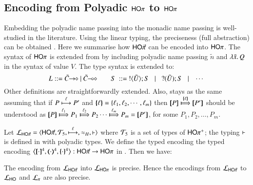 \subsection{Encoding from Polyadic $\mathsf{HO}\pi$ to $\mathsf{HO}\pi$}
\label{subsec:pho}
\noi Embedding the polyadic name passing 
into the monadic name passing is well-studied in the literature.    
Using the linear typing, 
the preciseness (full abstraction) can be obtained \cite{Yoshida96}.
Here we summarise how $\mathsf{HO}{\vec{\pi}}$ can be encoded into $\mathsf{HO}\pi$. 
The syntax of 
$\mathsf{HO}\pi$ is extended from \HOp by including 
polyadic name passing $\tilde{n}$ and $\lambda \tilde{x}.\,Q$ in the syntax 
of value $V$. The type syntax is extended to: 
%
\[
L ::= \shot{\tilde{C}} \ | \ \lhot{\tilde{C}}
\quad\quad S \ ::= \  \btout{\tilde{U}} S \bnfbar \btinp{\tilde{U}} S \bnfbar \cdots 
\]
%
Other definitions are straightforwardly extended. 
Also,  stays as the same
assuming that if 
$P \stackrel{\ell}{\longmapsto} P'$ and $\{\!\!\{\ell\}\!\!\} = \{\ell_1, \ell_2,  \cdots, \ell_m\}$ then
$\map{P} \Hby{\mapa{\ell}} \map{P'}$
should be understood as
$\map{P} \Hby{\ell_1} P_1 \Hby{\ell_2} P_2 \cdots \Hby{\ell_m} P_m =  \map{P'}$,
for some
$P_1, P_2, \ldots, P_m$.

Let $\tyl{L}_{\PHOp}=\calc{\PHOp}{{\cal{T}}_5}{\hby{\ell}}{\wb_H}{\proves}$
where 
${\cal{T}}_5$ is a set of types of $\mathsf{HO\pi^{+}}$;  
the typing $\vdash$ is defined in 
 with polyadic types. 
We define the typed encoding 
the typed encoding $\enco{\map{\cdot}^{4}, \mapt{\cdot}^{4}, \mapa{\cdot}^{4}}: \PHOp \to \HOp$ 
in . 
Then we have:

\smallskip 

\begin{theorem}
\label{f:enc:hopiptohopi}
The encoding from $\mathcal{L}_{\mathsf{HO}{\vec{\pi}}}$ into $\mathcal{L}_{\mathsf{HO}\pi}$ 
is precise. Hence the encodings 
from $\mathcal{L}_{\mathsf{HO}{\vec{\pi}}}$ to 
$\mathcal{L}_{\mathsf{HO}}$ 
and $\mathcal{L}_{\pi}$ 
are also precise. 
\end{theorem}


